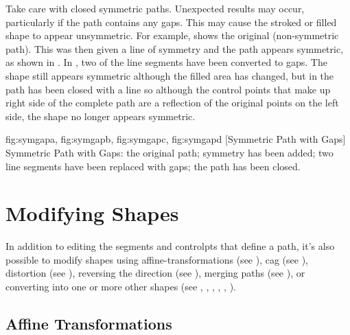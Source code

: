 \begin{warning}
Take care with closed symmetric paths. Unexpected results
may occur, particularly if the path contains any gaps. This may
cause the stroked or filled shape to appear unsymmetric.
For example,  shows the original
(non-symmetric path). This was then given a line of symmetry and
the path appears symmetric, as shown in . In
, two of the line segments have been
converted to gaps. The shape still appears symmetric although the
filled area has changed, but in  the path
has been closed with a line so although the control points that
make up right side of the complete path are a reflection of the
original points on the left side, the shape no longer appears
symmetric.
\end{warning}

{
  {fig:symgapa}{}{},
  {fig:symgapb}{}{},
  {fig:symgapc}{}{},
  {fig:symgapd}{}{}
}
[Symmetric Path with Gaps]
{Symmetric Path with Gaps:
 the original path;
 symmetry has been added;
 two line segments have been replaced with gaps;
 the path has been closed.}


\chapter{Modifying Shapes}\label{sec:modshape}

In addition to editing the segments and \glspl{controlpt}
that define a \gls{path}, it's also possible to modify \glspl{shape}
using \glspl{affine-transformation} (see
), \gls{cag} (see ),
distortion (see ),
reversing the direction (see ),
merging paths (see ),
or converting into one or more other \glspl{shape}
(see ,
, ,
, ,
). 

\section{Affine Transformations}\label{sec:affinetrans}

